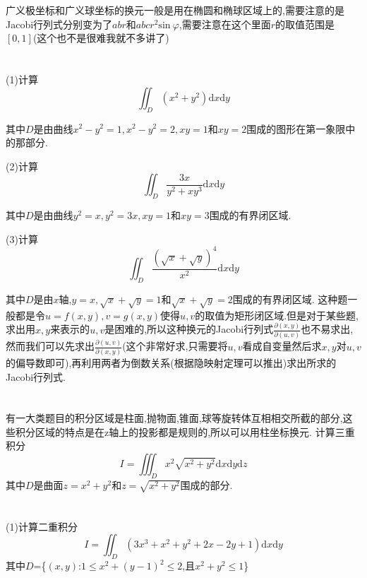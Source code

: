\documentclass{ctexart}
\begin{document}
\section{}
广义极坐标和广义球坐标的换元一般是用在椭圆和椭球区域上的,需要注意的是Jacobi行列式分别变为了$abr$和$abcr^{2}\mathrm{sin}\ \varphi$,需要注意在这个里面$r$的取值范围是$[0,1]$(这个也不是很难我就不多讲了)

\section{}

(1)计算$$\iint_{D}(x^{2}+y^{2})\mathrm{d}x\mathrm{d}y$$

其中$D$是由曲线$x^{2}-y^{2}=1,x^{2}-y^{2}=2,xy=1$和$xy=2$围成的图形在第一象限中的那部分.

(2)计算$$\iint_{D}\frac{3x}{y^{2}+xy^{3}}\mathrm{d}x\mathrm{d}y$$

其中$D$是由曲线$y^{2}=x,y^{2}=3x,xy=1$和$xy=3$围成的有界闭区域.

(3)计算$$\iint_{D}\frac{(\sqrt{x}+\sqrt{y})^{4}}{x^{2}}\mathrm{d}x\mathrm{d}y$$

其中$D$是由$x$轴,$y=x,\sqrt{x}+\sqrt{y}=1$和$\sqrt{x}+\sqrt{y}=2$围成的有界闭区域.
\newline
\newline
这种题一般都是令$u=f(x,y),v=g(x,y)$使得$u,v$的取值为矩形闭区域.但是对于某些题,求出用$x,y$来表示的$u,v$是困难的,所以这种换元的Jacobi行列式$\frac{\partial (x,y)}{\partial (u,v)}$也不易求出, 然而我们可以先求出$\frac{\partial (u,v)}{\partial (x,y)}$(这个非常好求,只需要将$u,v$看成自变量然后求$x,y$对$u,v$的偏导数即可),再利用两者为倒数关系(根据隐映射定理可以推出)求出所求的Jacobi行列式.
\section{}

有一大类题目的积分区域是柱面,抛物面,锥面,球等旋转体互相相交所截的部分,这些积分区域的特点是在z轴上的投影都是规则的,所以可以用柱坐标换元.
\newline
\newline
计算三重积分$$I=\iiint_{D}x^{2}\sqrt{x^{2}+y^{2}}\mathrm{d}x\mathrm{d}y\mathrm{d}z$$
其中$D$是曲面$z=x^{2}+y^{2}$和$z=\sqrt{x^{2}+y^{2}}$围成的部分.

\section{}
(1)计算二重积分$$I=\iint_{D}(3x^{3}+x^{2}+y^{2}+2x-2y+1)\mathrm{d}x\mathrm{d}y$$
其中$D$=\{$(x,y)$:$1\leq x^{2}+(y-1)^{2}\leq2$,且$x^{2}+y^{2}\leq1$\}
\end{document}
